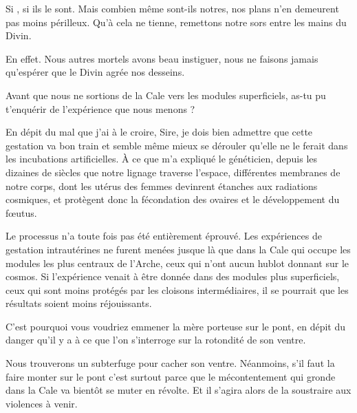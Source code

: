 \begin{drama}
  \elenaspeaks Si \alexas{}, si ils le sont. Mais combien même sont-ils notres, nos plans n’en demeurent pas moins périlleux. Qu’à cela ne tienne, remettons notre sors entre les mains du Divin.

  \alexasspeaks En effet. Nous autres mortels avons beau instiguer, nous ne faisons jamais qu’espérer que le Divin agrée nos desseins.

  \elenaspeaks Avant que nous ne sortions de la Cale vers les modules superficiels, as-tu pu t’enquérir de l’expérience que nous menons ?

  \alexasspeaks En dépit du mal que j’ai à le croire, Sire, je dois bien admettre que cette gestation va bon train et semble même mieux se dérouler qu’elle ne le ferait dans les incubations artificielles. À ce que m’a expliqué le généticien, depuis les dizaines de siècles que notre lignage traverse l’espace, différentes membranes de notre corps, dont les utérus des femmes devinrent étanches aux radiations cosmiques, et protègent donc la fécondation des ovaires et le développement du fœutus.

  \elenaspeaks Le processus n’a toute fois pas été entièrement éprouvé. Les expériences de gestation intrautérines ne furent menées jusque là que dans la Cale qui occupe les modules les plus centraux de l’Arche, ceux qui n’ont aucun hublot donnant sur le cosmos. Si l’expérience venait à être donnée dans des modules plus superficiels, ceux qui sont moins protégés par les cloisons intermédiaires, il se pourrait que les résultats soient moins réjouissants.

  \alexasspeaks C’est pourquoi vous voudriez emmener la mère porteuse sur le pont, en dépit du danger qu’il y a à ce que l’on s’interroge sur la rotondité de son ventre.

  \elenaspeaks Nous trouverons un subterfuge pour cacher son ventre. Néanmoins, s’il faut la faire monter sur le pont c’est surtout parce que le mécontentement qui gronde dans la Cale va bientôt se muter en révolte. Et il s’agira alors de la soustraire aux violences à venir.
\end{drama}

\scene


\StageDirII{\elena, \alexas}



